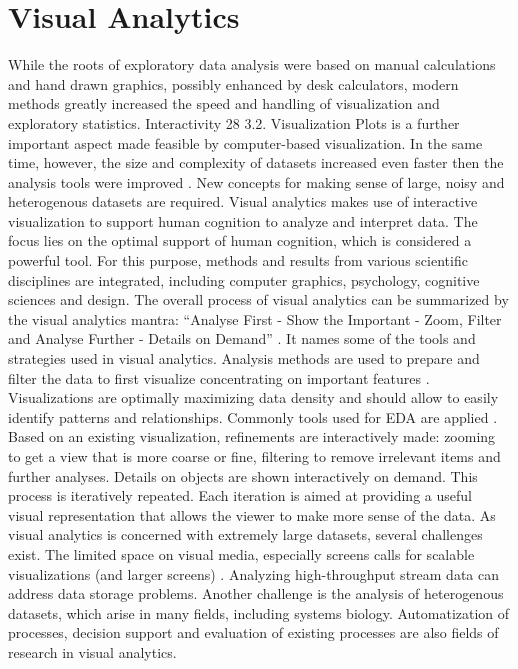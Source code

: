 \section{Visual Analytics}
While the roots of exploratory data analysis were based on manual calculations and
hand drawn graphics, possibly enhanced by desk calculators, modern methods greatly
increased the speed and handling of visualization and exploratory statistics. Interactivity
28
3.2. Visualization Plots
is a further important aspect made feasible by computer-based visualization. In the same
time, however, the size and complexity of datasets increased even faster then the analysis
tools were improved . New concepts for making sense of large, noisy and heterogenous
datasets are required. Visual analytics makes use of interactive visualization to support
human cognition to analyze and interpret data. The focus lies on the optimal support
of human cognition, which is considered a powerful tool. For this purpose, methods and
results from various scientific disciplines are integrated, including computer graphics,
psychology, cognitive sciences and design.
The overall process of visual analytics can be summarized by the visual analytics
mantra: “Analyse First - Show the Important - Zoom, Filter and Analyse Further - Details on Demand” . It names some of the tools and strategies used in visual analytics.
Analysis methods are used to prepare and filter the data to first visualize concentrating on important features . Visualizations are optimally maximizing data density and
should allow to easily identify patterns and relationships. Commonly tools used for EDA
are applied . Based on an existing visualization, refinements are interactively made:
zooming to get a view that is more coarse or fine, filtering to remove irrelevant items and
further analyses. Details on objects are shown interactively on demand. This process is
iteratively repeated. Each iteration is aimed at providing a useful visual representation
that allows the viewer to make more sense of the data.
As visual analytics is concerned with extremely large datasets, several challenges exist.
The limited space on visual media, especially screens calls for scalable visualizations (and
larger screens) . Analyzing high-throughput stream data can address data storage
problems. Another challenge is the analysis of heterogenous datasets, which arise in
many fields, including systems biology. Automatization of processes, decision support
and evaluation of existing processes are also fields of research in visual analytics.

